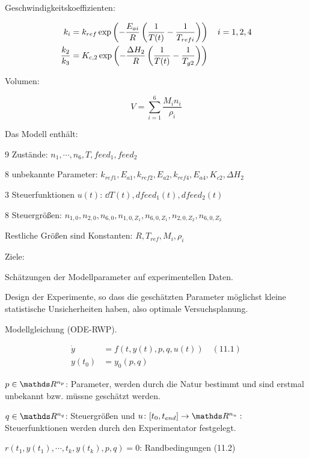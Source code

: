 Geschwindigkeitskoeffizienten:

\begin{align*}
k_i &= k_{ref} \exp \left( -\frac{E_{ai}}R \left( \frac 1{T(t)} - \frac 1{T_{refi}} \right) \right) \quad i = 1,2,4 \\
\frac{k_2}{k_3} &= K_{c,2} \exp \left( - \frac{\Delta H_2}{R} \left( \frac{1}{T(t)} - \frac1{T_{g2}} \right) \right) \\
\end{align*}

Volumen:

\[ V = \sum\limits_{i=1}^6 \frac{M_i n_i}{\rho_i} \]

Das Modell enthält:

\bitm
\item 9 Zustände: $n_1, \cdots, n_6, T, feed_1, feed_2$
\item 8 unbekannte Parameter: $k_{ref1}, E_{a1}, k_{ref2}, E_{a2}, k_{ref4}, E_{a4}, K_{c2}, \Delta H_2$ 
\item 3 Steuerfunktionen $u(t)$: $\dd T(t), dfeed_1(t), dfeed_2(t)$
\item 8 Steuergrößen: $n_{1,0}, n_{2,0}, n_{6,0}, n_{1,0,Z_1}, n_{6,0, Z_1}, n_{2,0,Z_2},n_{6,0,Z_2}$
\item Restliche Größen sind Konstanten: $R, T_{ref}, M_i, \rho_i$
\eitm

Ziele:

\bitm
\item Schätzungen der Modellparameter auf experimentellen Daten.
\item Design der Experimente, so dass die geschätzten Parameter möglichst kleine statistische Unsicherheiten haben, also optimale Versuchsplanung.
\eitm


Modellgleichung (\obda ODE-RWP).

\begin{align*}
\dot y &= f(t,y(t),p,q,u(t)) \quad (11.1) \\
y(t_0) &= y_0(p,q) 
\end{align*}

\bitm
\item $p \in \R^{n_p}$: Parameter, werden durch die Natur bestimmt und sind erstmal unbekannt bzw. müssne geschätzt werden.
\item $q \in \R^{n_q}$: Steuergrößen und $u\colon [\tn, \tend] \to \R^{n_u}:$ Steuerfunktionen werden durch den Experimentator festgelegt.
\item $r(t_1, y(t_1), \cdots, t_k, y(t_k), p, q) = 0$: Randbedingungen (11.2)
\eitm

